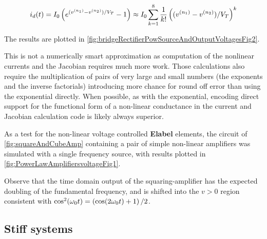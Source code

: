 \begin{dmath}\label{eqn:ece1254projectReport:1480}
i_d(t) = I_0 \lr{ e^{(v^{(n_1)} - v^{(n_2)})/V_T} - 1}
\approx
I_0 \sum_{k=1}^8
\inv{k!} \lr{(v^{(n_1)} - v^{(n_2)})/V_T}^k
\end{dmath}

The results are plotted in \cref{fig:bridgeRectifierPowSourceAndOutputVoltagesFig2}.


This is not a numerically smart approximation as computation of the nonlinear currents and the Jacobian requires much more work.
Those calculations also require the multiplication of pairs of very large and small numbers (the exponents and the inverse factorials) introducing more chance for round off error than using the exponential directly.
When possible, as with the exponential, encoding direct support for the functional form of a non-linear conductance in the current and Jacobian calculation code is likely always superior.

As a test for the non-linear voltage controlled \textbf{Elabel} elements, the circuit of \cref{fig:squareAndCubeAmp} containing a pair of simple non-linear amplifiers was simulated with a single frequency source, with results plotted in \cref{fig:PowerLawAmplifiersvoltageFig1}.



Observe that the time domain output of the squaring-amplifier
has the expected doubling of the fundamental frequency, and is shifted into the \( v > 0 \) region 
consistent with \( \cos^2(\omega_0 t) = \left(\cos(2 \omega_0 t) + 1\right)/2 \).

\subsection{Stiff systems}

